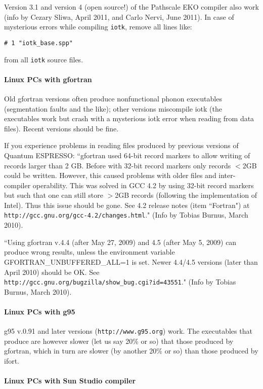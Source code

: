 \documentclass[12pt,a4paper]{article}
\def\qe{{\sc Quantum ESPRESSO}}
\begin{document}
Version 3.1 and version 4 (open source!) of the Pathscale EKO compiler
also work (info by Cezary Sliwa, April 2011, and Carlo Nervi, June 2011).
In case of mysterious errors while compiling \texttt{iotk},
remove all lines like:
\begin{verbatim}
# 1 "iotk_base.spp"
\end{verbatim}
from all \texttt{iotk} source files.

\paragraph{Linux PCs with gfortran}

Old gfortran versions often produce nonfunctional
phonon executables (segmentation faults and the like); other versions
miscompile iotk (the executables work but crash with a mysterious iotk
error when reading from data files). Recent versions should be fine.

If you experience problems in reading files produced by previous versions
of \qe: ``gfortran used 64-bit record markers to allow writing of records 
larger than 2 GB. Before with 32-bit record markers only records $<$2GB 
could be written. However, this caused problems with older files and 
inter-compiler operability. This was solved in GCC 4.2 by using 32-bit 
record markers but such that one can still store $>$2GB records (following 
the implementation of Intel). Thus this issue should be gone. See 4.2 
release notes (item ``Fortran") at 
\texttt{http://gcc.gnu.org/gcc-4.2/changes.html}."
(Info by Tobias Burnus, March 2010).

``Using gfortran v.4.4 (after May 27, 2009) and 4.5 (after May 5, 2009) can 
produce wrong results, unless the environment variable
GFORTRAN\_UNBUFFERED\_ALL=1 is set. Newer 4.4/4.5 versions
(later than April 2010) should be OK. See\\
\texttt{http://gcc.gnu.org/bugzilla/show\_bug.cgi?id=43551}."
(Info by Tobias Burnus, March 2010).

\paragraph{Linux PCs with g95}

g95 v.0.91 and later versions (\texttt{http://www.g95.org}) work. 
The executables that produce are however slower (let us say 20\% or so) 
that those produced by gfortran, which in turn are slower 
(by another 20\% or so) than those produced by ifort.

\paragraph{Linux PCs with Sun Studio compiler}
\end{document}
